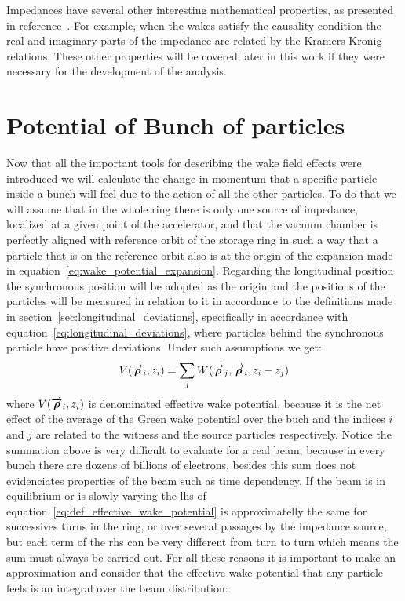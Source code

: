     Impedances have several other interesting mathematical properties, as presented in reference~\cite{CHao1993}. For example, when the wakes satisfy the causality condition the real and imaginary parts of the impedance are related by the Kramers Kronig relations\cite{kramers}. These other properties will be covered later in this work if they were necessary for the development of the analysis.

\section{Potential of Bunch of particles}

    Now that all the important tools for describing the wake field effects were introduced we will calculate the change in momentum that a specific particle inside a bunch will feel due to the action of all the other particles. To do that we will assume that in the whole ring there is only one source of impedance, localized at a given point of the accelerator, and that the vacuum chamber is perfectly aligned with reference orbit of the storage ring in such a way that a particle that is on the reference orbit also is at the origin of the expansion made in equation~\eqref{eq:wake_potential_expansion}. Regarding the longitudinal position the synchronous position will be adopted as the origin and the positions of the particles will be measured in relation to it in accordance to the definitions made in section~\ref{sec:longitudinal_deviations}, specifically in accordance with equation~\ref{eq:longitudinal_deviations}, where particles behind the synchronous particle have positive deviations. Under such assumptions we get:
    \begin{align}\label{eq:def_effective_wake_potential}
  	    V(\overrightarrow{\boldsymbol{\rho}}_i, z_i) = \sum_j W(\overrightarrow{\boldsymbol{\rho}}_j,\overrightarrow{\boldsymbol{\rho}}_i,z_i-z_j)
    \end{align}
    where $V(\overrightarrow{\boldsymbol{\rho}}_i, z_i)$ is denominated effective wake potential, because it is the net effect of the average of the Green wake potential over the buch and the indices $i$ and $j$ are related to the witness and the source particles respectively. Notice the summation above is very difficult to evaluate for a real beam, because in every bunch there are dozens of billions of electrons, besides this sum does not evidenciates properties of the beam such as time dependency. If the beam is in equilibrium or is slowly varying the \gls{lhs} of equation~\ref{eq:def_effective_wake_potential} is approximatelly the same for successives turns in the ring, or over several passages by the impedance source, but each term of the \gls{rhs} can be very different from turn to turn which means the sum must always be carried out. For all these reasons it is important to make an approximation and consider that the effective wake potential that any particle feels is an integral over the beam distribution:
